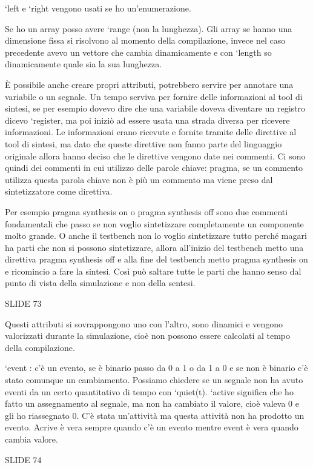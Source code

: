 \documentclass[10pt,a4paper,titlepage]{article}
\begin{document}
‘left e ‘right vengono usati se ho un’enumerazione.

Se ho un array posso avere ‘range (non la lunghezza). Gli array se hanno una dimensione fissa si risolvono al momento della compilazione, invece nel caso precedente avevo un vettore che cambia dinamicamente e con ‘length so dinamicamente quale sia la sua lunghezza.

È possibile anche creare propri attributi, potrebbero servire per annotare una variabile o un segnale. Un tempo serviva per fornire delle informazioni al tool di sintesi, se per esempio dovevo dire che una variabile doveva diventare un registro dicevo ‘register, ma poi iniziò ad essere usata una strada diversa per ricevere informazioni. Le informazioni erano ricevute e fornite tramite delle direttive al tool di sintesi, ma dato che queste direttive non fanno parte del linguaggio originale allora hanno deciso che le direttive vengono date nei commenti. Ci sono quindi dei commenti in cui utilizzo delle parole chiave: pragma, se un commento utilizza questa parola chiave non è più un commento ma viene preso dal sintetizzatore come direttiva.

Per esempio pragma synthesis on o pragma synthesis off sono due commenti fondamentali che passo se non voglio sintetizzare completamente un componente molto grande. O anche il testbench non lo voglio sintetizzare tutto perché magari ha parti che non si possono sintetizzare, allora all’inizio del testbench metto una direttiva  pragma synthesis off e alla fine del testbench metto  pragma synthesis on e ricomincio a fare la sintesi. Così può saltare tutte le parti che hanno senso dal punto di vista della simulazione e non della sentesi.

SLIDE 73

Questi attributi si sovrappongono uno con l’altro, sono dinamici e vengono valorizzati durante la simulazione, cioè non possono essere calcolati al tempo della compilazione.

‘event : c’è un evento, se è binario passo da 0 a 1 o da 1 a 0 e se non è binario c’è stato comunque un cambiamento.
Possiamo chiedere se un segnale non ha avuto eventi da un certo quantitativo di tempo con ‘quiet(t).
‘active significa che ho fatto un assegnamento al segnale, ma non ha cambiato il valore, cioè valeva 0 e gli ho riassegnato 0. C’è stata un’attività ma questa attività non ha prodotto un evento. Acrive è vera sempre quando c’è un evento mentre event è vera quando cambia valore.

SLIDE 74
\end{document}
